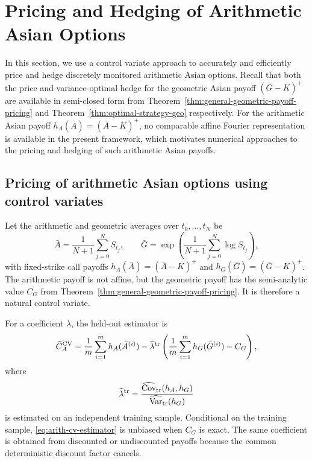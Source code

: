 \documentclass[10pt,a4paper,reqno]{amsart}
\theoremstyle{plain}
\theoremstyle{definition}
\theoremstyle{remark}
\theoremstyle{example}
\begin{document}
\section{Pricing and Hedging of Arithmetic Asian Options}\label{sec:arithmetic-Asian-options}

In this section, we use a control variate approach to accurately and efficiently price and hedge discretely monitored arithmetic Asian options. Recall that both the price and variance-optimal hedge for the geometric Asian payoff $(\bar{G}-K)^+$ are available in semi-closed form from Theorem~\ref{thm:general-geometric-payoff-pricing} and Theorem~\ref{thm:optimal-strategy-geo} respectively. For the arithmetic Asian payoff $h_A(\bar{A}) = (\bar{A}-K)^+$, no comparable affine Fourier representation is available in the present framework, which motivates numerical approaches to the pricing and hedging of such arithmetic Asian payoffs.


\subsection{Pricing of arithmetic Asian options using control variates}\label{sec:CV-pricing-arithmetic}

 Let the arithmetic and geometric averages over \(t_0,\ldots,t_N\) be
\[
 \bar A=\frac{1}{N+1}\sum_{j=0}^N S_{t_j},
 \qquad
 \bar G=\exp\!\left(\frac{1}{N+1}\sum_{j=0}^N\log S_{t_j}\right),
\]
with fixed-strike call payoffs \(h_A(\bar A)=(\bar A-K)^+\) and
 \(h_G(\bar G)=(\bar G-K)^+\).  The arithmetic payoff is not affine, but the geometric payoff has
the semi-analytic value \(C_G\) from Theorem~\ref{thm:general-geometric-payoff-pricing}.  It is
therefore a natural control variate.

For a coefficient \(\lambda\), the  held-out estimator is
\begin{equation}\label{eq:arith-cv-estimator}
 \widehat C_A^{\rm CV}
 =\frac{1}{m}\sum_{i=1}^m h_A(\bar A^{(i)})
 -\widehat\lambda^{\rm tr}
 \left(\frac{1}{m}\sum_{i=1}^m h_G(\bar G^{(i)})-C_G\right),
\end{equation}
where
 \[
 \widehat\lambda^{\rm tr}
 =\frac{\widehat{\operatorname{Cov}}_{\rm tr}(h_A,h_G)}{\widehat{\operatorname{Var}}_{\rm tr}(h_G)}
\]
 is estimated on an independent training sample.  Conditional on the training sample,
\eqref{eq:arith-cv-estimator} is unbiased when \(C_G\) is exact.  The same coefficient is obtained
from discounted or undiscounted payoffs because the common deterministic discount factor cancels.
\end{document}
